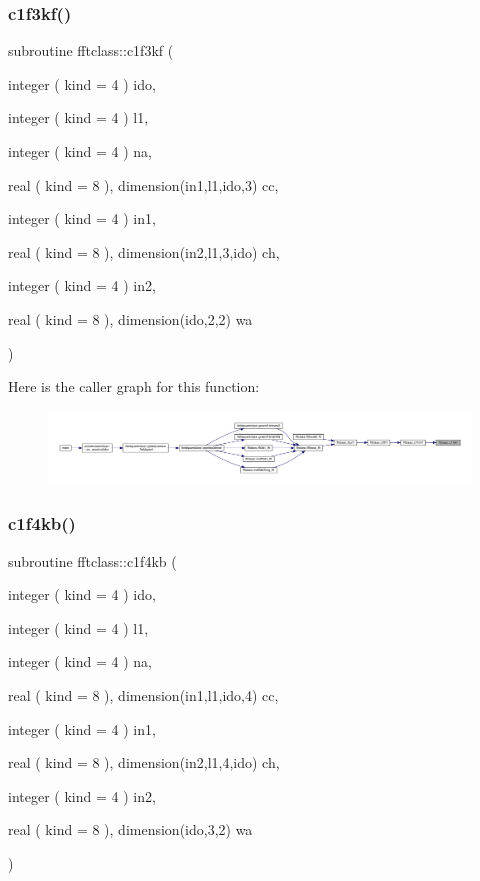\subsubsection{\texorpdfstring{c1f3kf()}{c1f3kf()}}
{\footnotesize\ttfamily subroutine fftclass\+::c1f3kf (\begin{DoxyParamCaption}\item[{integer ( kind = 4 )}]{ido,  }\item[{integer ( kind = 4 )}]{l1,  }\item[{integer ( kind = 4 )}]{na,  }\item[{real ( kind = 8 ), dimension(in1,l1,ido,3)}]{cc,  }\item[{integer ( kind = 4 )}]{in1,  }\item[{real ( kind = 8 ), dimension(in2,l1,3,ido)}]{ch,  }\item[{integer ( kind = 4 )}]{in2,  }\item[{real ( kind = 8 ), dimension(ido,2,2)}]{wa }\end{DoxyParamCaption})}

Here is the caller graph for this function\+:\nopagebreak
\begin{figure}[H]
\begin{center}
\leavevmode
\includegraphics[width=350pt]{namespacefftclass_ae586c2f39848274e0454c7d161522c31_icgraph}
\end{center}
\end{figure}
\mbox{\label{namespacefftclass_a16b67c4056cd4bef03d70d6289f60954}} 
\subsubsection{\texorpdfstring{c1f4kb()}{c1f4kb()}}
{\footnotesize\ttfamily subroutine fftclass\+::c1f4kb (\begin{DoxyParamCaption}\item[{integer ( kind = 4 )}]{ido,  }\item[{integer ( kind = 4 )}]{l1,  }\item[{integer ( kind = 4 )}]{na,  }\item[{real ( kind = 8 ), dimension(in1,l1,ido,4)}]{cc,  }\item[{integer ( kind = 4 )}]{in1,  }\item[{real ( kind = 8 ), dimension(in2,l1,4,ido)}]{ch,  }\item[{integer ( kind = 4 )}]{in2,  }\item[{real ( kind = 8 ), dimension(ido,3,2)}]{wa }\end{DoxyParamCaption})}

